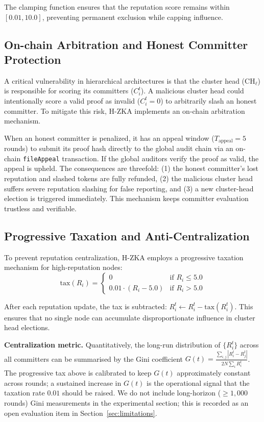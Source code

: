 \documentclass[journal]{IEEEtran}
\begin{document}
The clamping function ensures that the reputation score remains within $[0.01, 10.0]$, preventing permanent exclusion while capping influence.

\subsection{On-chain Arbitration and Honest Committer Protection}
\label{sec:onchain-arbitration}

A critical vulnerability in hierarchical architectures is that the cluster head ($\text{CH}_\ell$) is responsible for scoring its committers ($C_i^t$). A malicious cluster head could intentionally score a valid proof as invalid ($C_i^t = 0$) to arbitrarily slash an honest committer. To mitigate this risk, H-ZKA implements an on-chain arbitration mechanism.

When an honest committer is penalized, it has an appeal window ($T_{\text{appeal}} = 5$ rounds) to submit its proof hash directly to the global audit chain via an on-chain \texttt{fileAppeal} transaction. If the global auditors verify the proof as valid, the appeal is upheld. The consequences are threefold: (1) the honest committer's lost reputation and slashed tokens are fully refunded, (2) the malicious cluster head suffers severe reputation slashing for false reporting, and (3) a new cluster-head election is triggered immediately. This mechanism keeps committer evaluation trustless and verifiable.

\subsection{Progressive Taxation and Anti-Centralization}

To prevent reputation centralization, H-ZKA employs a progressive taxation mechanism for high-reputation nodes:
\begin{equation}
\text{tax}(R_i) = \begin{cases}
0 & \text{if } R_i \leq 5.0 \\
0.01 \cdot (R_i - 5.0) & \text{if } R_i > 5.0
\end{cases}
\label{eq:tax}
\end{equation}

After each reputation update, the tax is subtracted: $R_i^t \leftarrow R_i^t - \text{tax}(R_i^t)$. This ensures that no single node can accumulate disproportionate influence in cluster head elections.

\textbf{Centralization metric.} Quantitatively, the long-run distribution of $\{R_i^{t}\}$ across all committers can be summarised by the Gini coefficient $G(t) = \frac{\sum_{i,j}|R_i^{t}-R_j^{t}|}{2N\sum_i R_i^{t}}$. The progressive tax above is calibrated to keep $G(t)$ approximately constant across rounds; a sustained increase in $G(t)$ is the operational signal that the taxation rate $0.01$ should be raised. We do not include long-horizon ($\ge 1{,}000$ rounds) Gini measurements in the experimental section; this is recorded as an open evaluation item in Section~\ref{sec:limitations}.
\end{document}
